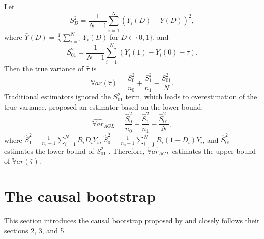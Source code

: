 \documentclass[aodsor,preprint]{imsart}
\numberwithin{equation}{section}
\theoremstyle{plain}
\newcommand{\Var}{{\mathbb{V}ar}}
\begin{document}
Let
$$S_D^2 = \frac{1}{N-1} \sum_{i = 1}^{N} (Y_i(D) - \bar{Y}(D))^2,$$
where $\bar{Y}(D) = \frac{1}{N} \sum_{i = 1}^{N} Y_i(D)$ for $D\in \{0, 1\}$, and
$$S_{01}^2 = \frac{1}{N-1} \sum_{i = 1}^{N} (Y_i(1) - Y_i(0) - \tau).$$ Then the true variance of $\widehat{\tau}$ is
$$
\Var(\widehat{\tau}) = \frac{S_0^2}{n_0} + \frac{S_1^2}{n_1} - \frac{S_{01}^2}{N}.
$$
Traditional estimators ignored the $S_{01}^2$ term, which leads to overestimation of the true variance. \cite{aronow_2014} proposed an estimator based on the lower bound:
$$
\widehat{\Var}_{AGL} = \frac{\widehat{S}_0^2}{n_0} + \frac{\widehat{S}_1^2}{n_1} - \frac{\widehat{S}_{01}^2}{N},
$$
where $\widehat{S}_1^2 = \frac{1}{n_1 - 1} \sum_{i = 1}^{N} R_i D_i Y_i$, $\widehat{S}_0^2 = \frac{1}{n_0 - 1} \sum_{i = 1}^{N} R_i (1 - D_i) Y_i$, and $\widehat{S}_{01}^2$ estimates the lower bound of $S_{01}^2$ \citep[see][section 3]{aronow_2014}. Therefore, $\widehat{\Var}_{AGL}$ estimates the upper bound of $\Var(\widehat{\tau})$.

\section{The causal bootstrap} \label{bootstrap}

This section introduces the causal bootstrap proposed by \cite{Imbens_2021} and closely follows their sections 2, 3, and 5.
\end{document}
